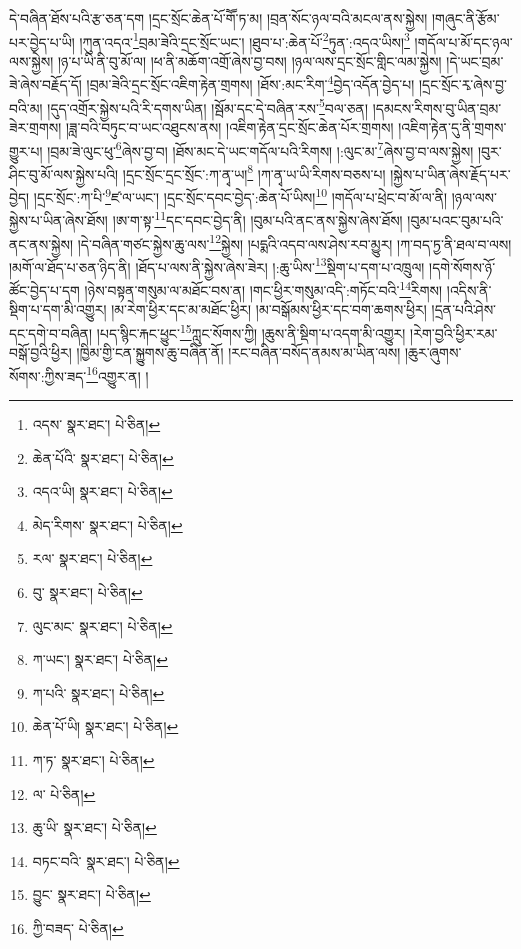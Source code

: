 དེ་བཞིན་ཐོས་པའི་རྩ་ཅན་དག །དྲང་སྲོང་ཆེན་པོ་གཽ་ཏ་མ། །བྲན་སོང་ཉལ་བའི་མངལ་ནས་སྐྱེས། །གཞུང་ནི་རྩོམ་པར་བྱེད་པ་ཡི། །ཀུན་འདའ་\footnote{འདས་  སྣར་ཐང་།  པེ་ཅིན། }བྲམ་ཟེའི་དྲང་སྲོང་ཡང་། །ཐུབ་པ་:ཆེན་པོ་\footnote{ཆེན་པོའི་  སྣར་ཐང་།  པེ་ཅིན། }ཏུན་:འདའ་ཡིས།\footnote{འདའ་ཡི།  སྣར་ཐང་།  པེ་ཅིན། } །གདོལ་པ་མོ་དང་ཉལ་ལས་སྐྱེས། །ཉ་པ་ཡི་ནི་བུ་མོ་ལ། །ཕ་ནི་མཆོག་འགྲོ་ཞེས་བྱ་བས། །ཉལ་ལས་དྲང་སྲོང་གླིང་ལམ་སྐྱེས། །དེ་ཡང་བྲམ་ཟེ་ཞེས་བརྗོད་དོ། །བྲམ་ཟེའི་དྲང་སྲོང་འཇིག་རྟེན་གྲགས། །ཐོས་:མང་རིག་\footnote{མེད་རིགས་  སྣར་ཐང་།  པེ་ཅིན། }བྱེད་འདོན་བྱེད་པ། །དྲང་སྲོང་རྭ་ཞེས་བྱ་བའི་མ། །དུད་འགྲོར་སྐྱེས་པའི་རི་དགས་ཡིན། །སྦོམ་དང་དེ་བཞིན་རས་\footnote{རལ་  སྣར་ཐང་།  པེ་ཅིན། }བལ་ཅན། །དམངས་རིགས་བུ་ཡིན་བྲམ་ཟེར་གྲགས། །ཟླ་བའི་བཏུང་བ་ཡང་འཐུངས་ནས། །འཇིག་རྟེན་དྲང་སྲོང་ཆེན་པོར་གྲགས། །འཇིག་རྟེན་དུ་ནི་གྲགས་གྱུར་པ། །བྲམ་ཟེ་ལུང་ཕུ་\footnote{བུ་  སྣར་ཐང་།  པེ་ཅིན། }ཞེས་བྱ་བ། །ཐོས་མང་དེ་ཡང་གདོལ་པའི་རིགས། །:ལུང་མ་\footnote{ལུང་མང་  སྣར་ཐང་།  པེ་ཅིན། }ཞེས་བྱ་བ་ལས་སྐྱེས། །བུར་ཤིང་བུ་མོ་ལས་སྐྱེས་པའི། །དྲང་སྲོང་དྲང་སྲོང་:ཀ་ནྭ་ཡ།\footnote{ཀ་ཡང་།  སྣར་ཐང་།  པེ་ཅིན། } །ཀ་ནྭ་ཡ་ཡི་རིགས་བཅས་པ། །སྐྱེས་པ་ཡིན་ཞེས་རྗོད་པར་བྱེད། །དྲང་སྲོང་:ཀ་པི་\footnote{ཀ་པའི་  སྣར་ཐང་།  པེ་ཅིན། }ཛ་ལ་ཡང་། །དྲང་སྲོང་དབང་བྱེད་:ཆེན་པོ་ཡིས།\footnote{ཆེན་པོ་ཡི།  སྣར་ཐང་།  པེ་ཅིན། } །གདོལ་པ་ཕྲེང་བ་མོ་ལ་ནི། །ཉལ་ལས་སྐྱེས་པ་ཡིན་ཞེས་ཐོས། །ཨ་ག་སྟ་\footnote{ཀ་ཏ་  སྣར་ཐང་།  པེ་ཅིན། }དང་དབང་བྱེད་ནི། །བུམ་པའི་ནང་ནས་སྐྱེས་ཞེས་ཐོས། །བུམ་པའང་བུམ་པའི་ནང་ནས་སྐྱེས། །དེ་བཞིན་གཙང་སྐྱེས་ཆུ་ལས་\footnote{ལ་  པེ་ཅིན། }སྐྱེས། །པདྨའི་འདབ་ལས་ཤེས་རབ་མྱུར། །ཀ་བད་ཏྱ་ནི་ཐལ་བ་ལས། །མགོ་ལ་ཐོད་པ་ཅན་ཉིད་ནི། །ཐོད་པ་ལས་ནི་སྐྱེས་ཞེས་ཟེར། །:ཆུ་ཡིས་\footnote{ཆུ་ཡི་  སྣར་ཐང་།  པེ་ཅིན། }སྡིག་པ་དག་པ་འཁྲུལ། །དགེ་སོགས་ཉོ་ཚོང་བྱེད་པ་དག །ཉེས་བསྟན་གསུམ་ལ་མཐོང་བས་ན། །གང་ཕྱིར་གསུམ་འདི་:གཏོང་བའི་\footnote{བཏང་བའི་  སྣར་ཐང་།  པེ་ཅིན། }རིགས། །འདིས་ནི་སྡིག་པ་དག་མི་འགྱུར། །མ་རེག་ཕྱིར་དང་མ་མཐོང་ཕྱིར། །མ་བསྒོམས་ཕྱིར་དང་བག་ཆགས་ཕྱིར། །དྲན་པའི་ཤེས་དང་དགེ་བ་བཞིན། །པད་སྙིང་རྐང་ཕྱུང་\footnote{བྱུང་  སྣར་ཐང་།  པེ་ཅིན། }ཀླུང་སོགས་ཀྱི། །ཆུས་ནི་སྡིག་པ་འདག་མི་འགྱུར། །རེག་བྱའི་ཕྱིར་རམ་བསྒོ་བྱའི་ཕྱིར། །ཁྱིམ་གྱི་ངན་སྐྱུགས་ཆུ་བཞིན་ནོ། །རང་བཞིན་བསོད་ནམས་མ་ཡིན་ལས། །ཆུར་ཞུགས་སོགས་:ཀྱིས་ཟད་\footnote{ཀྱི་བཟད་  པེ་ཅིན། }འགྱུར་ན། །

